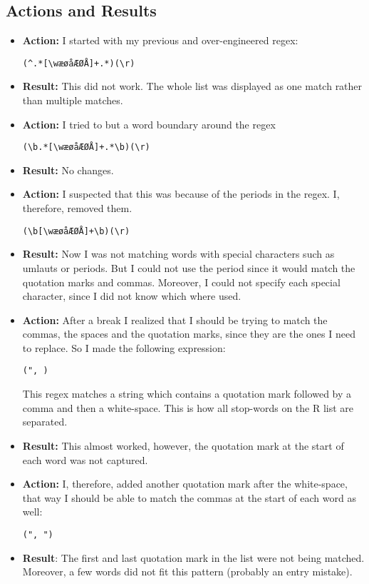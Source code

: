 \documentclass{article}
\begin{document}
\subsection{Actions and Results}
\begin{itemize}

\item \textbf{Action:} I started with my previous and over-engineered regex:
\begin{verbatim}
(^.*[\wæøåÆØÅ]+.*)(\r)
\end{verbatim}
\item \textbf{Result:} This did not work. The whole list was displayed as one match rather than multiple matches. 

\item \textbf{Action:} I tried to but a word boundary around the regex
\begin{verbatim}
(\b.*[\wæøåÆØÅ]+.*\b)(\r)
\end{verbatim}
\item \textbf{Result:} No changes. 

\item \textbf{Action:} I suspected that this was because of the periods in the regex. I, therefore, removed them. 
\begin{verbatim}
(\b[\wæøåÆØÅ]+\b)(\r)
\end{verbatim}
\item \textbf{Result:} Now I was not matching words with special characters such as umlauts or periods. But I could not use the period since it would match the quotation marks and commas. Moreover, I could not specify each special character, since I did not know which where used.

\item \textbf{Action:} After a break I realized that I should be trying to match the commas, the spaces and the quotation marks, since they are the ones I need to replace. So I made the following expression:
\begin{verbatim}
(", )
\end{verbatim}
This regex matches a string which contains a quotation mark followed by a comma and then a white-space. This is how all stop-words on the R list are separated.
\item \textbf{Result:} This almost worked, however, the quotation mark at the start of each word was not captured. 

\item \textbf{Action:} I, therefore, added another quotation mark after the white-space, that way I should be able to match the commas at the start of each word as well:
\begin{verbatim}
(", ")
\end{verbatim}
\item \textbf{Result}: The first and last quotation mark in the list were not being matched. Moreover, a few words did not fit this pattern (probably an entry mistake). 


\end{itemize}
\end{document}
